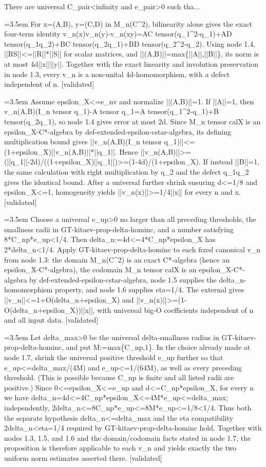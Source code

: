 \documentclass{article}
\newcommand{\step}[1]{\par\noindent\hangindent=3.5em\hangafter=1%
  \makebox[3.5em][l]{\textbf{#1.}}}
\newcommand{\steptag}[1]{\hfill{\small\textsf{[#1]}}}
\begin{document}
\begin{proofbox}{There are universal C\_pair<infinity and e\_pair>0 such tha...}
\step{1.5} For x=(A,B), y=(C,D) in M\_n(C\textasciicircum{}2), bilinearity alone gives the exact four-term identity v\_n(x)v\_n(y)-v\_n(xy)=AC tensor(q\_1\textasciicircum{}2-q\_1)+AD tensor(q\_1q\_2)+BC tensor(q\_2q\_1)+BD tensor(q\_2\textasciicircum{}2-q\_2). Using node 1.4, ||RS||<=||R||*||S|| for scalar matrices, and ||(A,B)||=max\{||A||,||B||\}, its norm is at most 4d||x||||y||. Together with the exact linearity and involution preservation in node 1.3, every v\_n is a non-unital 4d-homomorphism, with a defect independent of n. \steptag{validated} \\[4pt]
\step{1.6} Assume epsilon\_X<=e\_nv and normalize ||(A,B)||=1. If ||A||=1, then v\_n(A,B)(I\_n tensor q\_1)-A tensor q\_1=A tensor(q\_1\textasciicircum{}2-q\_1)+B tensor(q\_2q\_1), so node 1.4 gives error at most 2d. Since M\_n tensor calX is an epsilon\_X-C*-algebra by def-extended-epsilon-cstar-algebra, its defining multiplication bound gives ||v\_n(A,B)(I\_n tensor q\_1)||<=(1+epsilon\_X)||v\_n(A,B)||*||q\_1||. Hence ||v\_n(A,B)||>=(||q\_1||-2d)/((1+epsilon\_X)||q\_1||)>=(1-4d)/(1+epsilon\_X). If instead ||B||=1, the same calculation with right multiplication by q\_2 and the defect q\_1q\_2 gives the identical bound. After a universal further shrink ensuring d<=1/8 and epsilon\_X<=1, homogeneity yields ||v\_n(x)||>=1/4||x|| for every n and x. \steptag{validated} \\[4pt]
\step{1.7} Choose a universal e\_up>0 no larger than all preceding thresholds, the smallness radii in GT-kitaev-prop-delta-hominc, and a number satisfying 8*C\_np*e\_up<1/4. Then delta\_n:=4d<=4*C\_np*epsilon\_X has 2*delta\_n<1/4. Apply GT-kitaev-prop-delta-hominc to each fixed canonical v\_n from node 1.3: the domain M\_n(C\textasciicircum{}2) is an exact C*-algebra (hence an epsilon\_X-C*-algebra), the codomain M\_n tensor calX is an epsilon\_X-C*-algebra by def-extended-epsilon-cstar-algebra, node 1.5 supplies the delta\_n-homomorphism property, and node 1.6 supplies eta=1/4. The external gives ||v\_n||<=1+O(delta\_n+epsilon\_X) and ||v\_n(x)||>=(1-O(delta\_n+epsilon\_X))||x||, with universal big-O coefficients independent of n and all input data. \steptag{validated} \\[6pt]
\step{1.7.1} Let delta\_max>0 be the universal delta-smallness radius in GT-kitaev-prop-delta-hominc, and put M:=max\{C\_np,1\}. In the choice already made at node 1.7, shrink the universal positive threshold e\_up further so that e\_up<=delta\_max/(4M) and e\_up<=1/(64M), as well as every preceding threshold. (This is possible because C\_np is finite and all listed radii are positive.) Since 0<=epsilon\_X<=e\_up and d<=C\_np*epsilon\_X, for every n we have delta\_n=4d<=4C\_np*epsilon\_X<=4M*e\_up<=delta\_max; independently, 2delta\_n<=8C\_np*e\_up<=8M*e\_up<=1/8<1/4. Thus both the separate hypothesis delta\_n<=delta\_max and the eta compatibility 2delta\_n<eta=1/4 required by GT-kitaev-prop-delta-hominc hold. Together with nodes 1.3, 1.5, and 1.6 and the domain/codomain facts stated in node 1.7, the proposition is therefore applicable to each v\_n and yields exactly the two uniform norm estimates asserted there. \steptag{validated} \\[4pt]

\end{proofbox}
\end{document}
